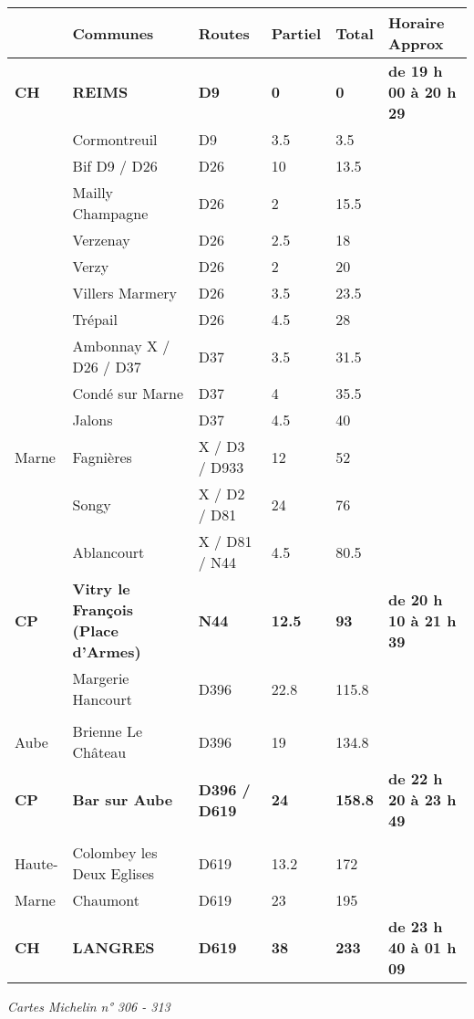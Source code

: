 \documentclass{article}%
\begin{document}
\begin{longtable}{p{2.25cm}|p{7.0cm}|p{1.5cm}|p{1.5cm}|p{1.5cm}|p{3.5cm}}%
\hline%
&Communes&Routes&Partiel&Total&Horaire Approx\\%
\hline%
\endhead%
\endfoot%
\endlastfoot%
\textbf{﻿CH}&\textbf{REIMS}&\textbf{D9}&\textbf{0}&\textbf{0}&\textbf{de 19 h 00 à 20 h 29}\\%
 &Cormontreuil&D9&3.5&3.5& \\%
 &Bif D9  / D26&D26&10&13.5& \\%
 &Mailly  Champagne&D26&2&15.5& \\%
 &Verzenay&D26 &2.5&18& \\%
 &Verzy&D26&2&20& \\%
 &Villers Marmery&D26&3.5&23.5& \\%
 &Trépail&D26&4.5&28& \\%
 &Ambonnay X / D26 / D37&D37&3.5&31.5& \\%
 &Condé sur Marne &D37&4&35.5& \\%
 &Jalons&D37&4.5&40& \\%
Marne&Fagnières&X / D3 / D933&12&52& \\%
 &Songy&X / D2 / D81&24&76& \\%
 &Ablancourt&X / D81 / N44&4.5&80.5& \\%
\textbf{CP}&\textbf{Vitry le François (Place d'Armes)}&\textbf{N44}&\textbf{12.5}&\textbf{93}&\textbf{de 20 h 10 à  21 h 39}\\%
 &Margerie Hancourt&D396&22.8&115.8& \\%
\hline& & & & & \\%
Aube&Brienne Le Château&D396&19&134.8& \\%
\textbf{CP}&\textbf{Bar sur Aube}&\textbf{D396 / D619}&\textbf{24}&\textbf{158.8}&\textbf{de 22 h 20 à  23 h 49}\\%
\hline& & & & & \\%
Haute-&Colombey les Deux Eglises&D619&13.2&172& \\%
Marne&Chaumont &D619&23&195& \\%
\textbf{CH}&\textbf{LANGRES}&\textbf{D619}&\textbf{38}&\textbf{233}&\textbf{de 23 h 40 à  01 h 09}\\%
\hline%
\end{longtable}%
\begin{flushleft} \textit{Cartes Michelin n° 306 - 313 
} \end{flushleft}%
\end{document}
